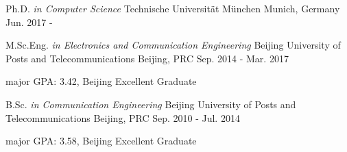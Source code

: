 



\begin{cventries}

\cventry
{Ph.D. \it{in Computer Science}} %
{Technische Universität München} %
{Munich, Germany} %
{Jun. 2017 - } %
{ %
}


\cventry
{M.Sc.Eng. \it{in Electronics and Communication Engineering}} %
{Beijing University of Posts and Telecommunications} %
{Beijing, PRC} %
{Sep. 2014 - Mar. 2017} %
{ %
\begin{cvitems}
\item {major GPA: 3.42, Beijing Excellent Graduate}
\end{cvitems}
}


\cventry
{B.Sc. \it{in Communication Engineering}} %
{Beijing University of Posts and Telecommunications} %
{Beijing, PRC} %
{Sep. 2010 - Jul. 2014} %
{ %
\begin{cvitems}
\item {major GPA: 3.58, Beijing Excellent Graduate}
\end{cvitems}
}%

\end{cventries}
